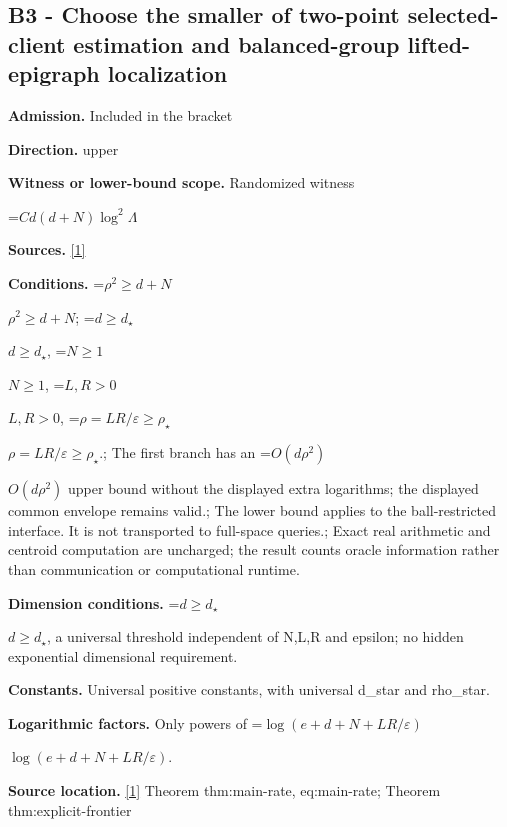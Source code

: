 \documentclass[10pt,a4paper]{article}
\newcommand{\AtlasMath}[1]{\par\begingroup\centering\setbox0=\hbox{$\displaystyle #1$}\ifdim\wd0>1.4\linewidth\typeout{ATLAS WIDE FORMULA: \the\wd0}\fi\ifdim\wd0>\linewidth\resizebox{\linewidth}{!}{\box0}\else\box0\fi\par\endgroup}
\newcommand{\AtlasInlineMath}[1]{\begingroup\setbox0=\hbox{$#1$}\ifdim\wd0>.4\linewidth\endgroup\AtlasMath{#1}\else\endgroup$#1$\fi}
\begin{document}
\subsection{B3 - Choose the smaller of two-point selected-client estimation and balanced-group lifted-epigraph localization}


\textbf{Admission.} Included in the bracket



\textbf{Direction.} upper



\textbf{Witness or lower-bound scope.} Randomized witness



\AtlasMath{Cd(d+N)\log^2\Lambda}


\textbf{Sources.} \href{https://github.com/WU-Wendao/Colombo/blob/main/colombo_sensorium/Complexity_altas/data/sources/colombo/U05/manuscript.pdf}{[1]}



\textbf{Conditions.} \AtlasInlineMath{\rho^2\ge d+N}; \AtlasInlineMath{d\ge d_\star}, \AtlasInlineMath{N\ge1}, \AtlasInlineMath{L,R>0}, \AtlasInlineMath{\rho=LR/\varepsilon\ge\rho_\star}.; The first branch has an \AtlasInlineMath{O(d\rho^2)} upper bound without the displayed extra logarithms; the displayed common envelope remains valid.; The lower bound applies to the ball-restricted interface. It is not transported to full-space queries.; Exact real arithmetic and centroid computation are uncharged; the result counts oracle information rather than communication or computational runtime.



\textbf{Dimension conditions.} \AtlasInlineMath{d\ge d_\star}, a universal threshold independent of N,L,R and epsilon; no hidden exponential dimensional requirement.



\textbf{Constants.} Universal positive constants, with universal d\_star and rho\_star.



\textbf{Logarithmic factors.} Only powers of \AtlasInlineMath{\log(e+d+N+LR/\varepsilon)}.



\textbf{Source location.} \href{https://github.com/WU-Wendao/Colombo/blob/main/colombo_sensorium/Complexity_altas/data/sources/colombo/U05/manuscript.pdf}{[1]} Theorem thm:main-rate, eq:main-rate; Theorem thm:explicit-frontier
\end{document}
